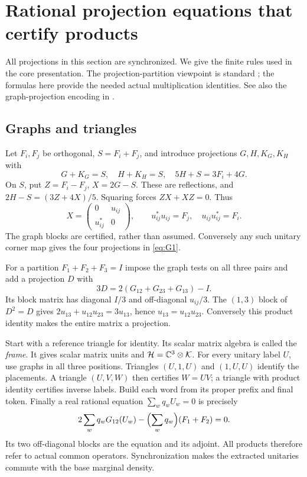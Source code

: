 \section{Rational projection equations that certify products}\label{sec:projection}
All projections in this section are synchronized. We give the finite rules used in the core presentation. The projection-partition viewpoint is standard \cite{Fritz}; the formulas here provide the needed actual multiplication identities. See also the graph-projection encoding in \cite[Section 4]{CZ}.

\subsection{Graphs and triangles}
Let $F_i,F_j$ be orthogonal, $S=F_i+F_j$, and introduce projections $G,H,K_G,K_H$ with
\begin{equation}\label{eq:G1}
 G+K_G=S,\quad H+K_H=S,\quad 5H+S=3F_i+4G.
\end{equation}
On $S$, put $Z=F_i-F_j$, $X=2G-S$. These are reflections, and $2H-S=(3Z+4X)/5$. Squaring forces $ZX+XZ=0$. Thus
\[
 X=\begin{pmatrix}0&u_{ij}\\u_{ij}^*&0\end{pmatrix},\qquad
 u_{ij}^*u_{ij}=F_j,\quad u_{ij}u_{ij}^*=F_i.
\]
The graph blocks are certified, rather than assumed. Conversely any such unitary corner map gives the four projections in \eqref{eq:G1}.

For a partition $F_1+F_2+F_3=I$ impose the graph tests on all three pairs and add a projection $D$ with
\begin{equation}\label{eq:G2}
 3D=2(G_{12}+G_{23}+G_{13})-I.
\end{equation}
Its block matrix has diagonal $I/3$ and off-diagonal $u_{ij}/3$. The $(1,3)$ block of $D^2=D$ gives $2u_{13}+u_{12}u_{23}=3u_{13}$, hence $u_{13}=u_{12}u_{23}$. Conversely this product identity makes the entire matrix a projection.

Start with a reference triangle for identity. Its scalar matrix algebra is called the \emph{frame}. It gives scalar matrix units and $\mathcal H=\mathbb C^3\otimes\mathcal K$. For every unitary label $U$, use graphs in all three positions. Triangles $(U,1,U)$ and $(1,U,U)$ identify the placements. A triangle $(U,V,W)$ then certifies $W=UV$; a triangle with product identity certifies inverse labels. Build each word from its proper prefix and final token. Finally a real rational equation $\sum_wq_wU_w=0$ is precisely
\begin{equation}\label{eq:G3}
 2\sum_wq_wG_{12}(U_w)-\Bigl(\sum_wq_w\Bigr)(F_1+F_2)=0.
\end{equation}
Its two off-diagonal blocks are the equation and its adjoint. All products therefore refer to actual common operators. Synchronization makes the extracted unitaries commute with the base marginal density.

